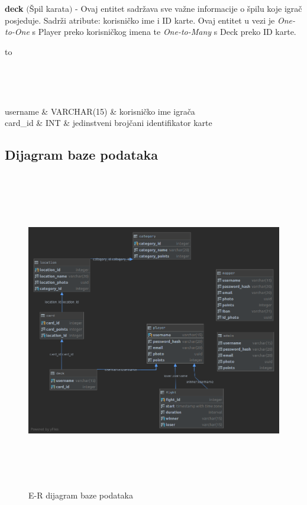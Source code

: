 				{\noindent\textbf{deck} $($Špil karata$)$ - Ovaj entitet sadržava sve važne informacije o špilu koje igrač posjeduje. Sadrži atribute: korisničko ime i ID karte. Ovaj entitet u vezi je \textit{One-to-One} s Player preko korisničkog imena te \textit{One-to-Many} s Deck preko ID karte.}
				
				\begin{longtabu} to \textwidth {|X[6, l]|X[6, l]|X[20, l]|}
					
					\hline {}	 \\[3pt] \hline
					\endfirsthead
					
					\hline {}	 \\[3pt] \hline
					\endhead
					
					\hline 
					\endlastfoot
					
					username & VARCHAR(15)	&   korisničko ime igrača	\\ \hline
					 card\_id	& INT &   jedinstveni brojčani identifikator karte	\\ \hline 
					
					
				\end{longtabu}
			
			
			\subsection{Dijagram baze podataka}
				\begin{figure}[H]
					\includegraphics[width=\linewidth, height=14cm]{dijagrami/geofighterdb_diagram}				
					\centering
					\caption{E-R dijagram baze podataka}
					\label{}
				\end{figure}
			
